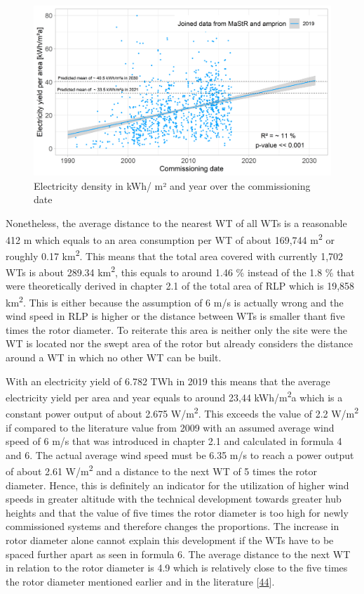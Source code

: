 \documentclass[a4paper,11pt]{article}
\begin{document}
\begin{figure}[H]

{\centering \includegraphics[width=1\linewidth]{data/MaStR_amprion_analysis/results_of_analysis/e_yield_per_m2_over_commissioning_date} 

}

\caption{Electricity density in kWh/ m² and year over the commissioning date}\label{fig:eyarea}
\end{figure}
Nonetheless, the average distance to the nearest WT of all WTs is a reasonable 412 m which equals to an area consumption per WT of about 169,744 m\textsuperscript{2} or roughly 0.17 km\textsuperscript{2}. This means that the total area covered with currently 1,702 WTs is about 289.34 km\textsuperscript{2}, this equals to around 1.46 \% instead of the 1.8 \% that were theoretically derived in chapter 2.1 of the total area of RLP which is 19,858 km\textsuperscript{2}. This is either because the assumption of 6 m/s is actually wrong and the wind speed in RLP is higher or the distance between WTs is smaller thant five times the rotor diameter. To reiterate this area is neither only the site were the WT is located nor the swept area of the rotor but already considers the distance around a WT in which no other WT can be built.

With an electricity yield of 6.782 TWh in 2019 this means that the average electricity yield per area and year equals to around 23,44 kWh/m\textsuperscript{2}a which is a constant power output of about 2.675 W/m\textsuperscript{2}. This exceeds the value of 2.2 W/m\textsuperscript{2} if compared to the literature value from 2009 with an assumed average wind speed of 6 m/s that was introduced in chapter 2.1 and calculated in formula 4 and 6. The actual average wind speed must be 6.35 m/s to reach a power output of about 2.61 W/m\textsuperscript{2} and a distance to the next WT of 5 times the rotor diameter. Hence, this is definitely an indicator for the utilization of higher wind speeds in greater altitude with the technical development towards greater hub heights and that the value of five times the rotor diameter is too high for newly commissioned systems and therefore changes the proportions. The increase in rotor diameter alone cannot explain this development if the WTs have to be spaced further apart as seen in formula 6. The average distance to the next WT in relation to the rotor diameter is 4.9 which is relatively close to the five times the rotor diameter mentioned earlier and in the literature {[}\protect\hyperlink{ref-DavidJCMacKay.2009}{44}{]}.
\end{document}
